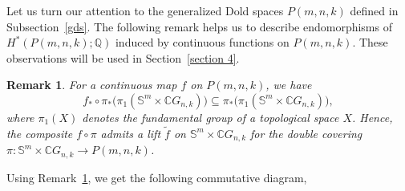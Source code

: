 \documentclass{amsart}
\newtheorem{remark}[theorem]{Remark}
\newcommand{\secref}[1]{Section~\ref{#1}}
\newcommand{\remref}[1]{Remark~\ref{#1}}
\newcommand{\subsecref}[1]{Subsection~\ref{#1}}
\begin{document}
	Let us turn our attention to the generalized Dold spaces $P(m,n,k)$ defined in \subsecref{gds}. The following remark helps us to describe endomorphisms of $H^*(P(m,n,k);\mathbb{Q})$ induced by continuous functions on $P(m,n,k)$. These observations will be used in \secref{section 4}.
	\begin{remark}\label{lift}
		For a continuous map $f$ on $P(m,n,k)$, we have  
		\begin{equation} \label{lift of f}
			f_*\circ \pi_*\big(\pi_1(\mathbb{S}^m\times \mathbb{C}G_{n,k})\big)
			\subseteq \pi_*\big(\pi_1(\mathbb{S}^m\times \mathbb{C}G_{n,k})\big),
		\end{equation}
		where $\pi_1(X)$ denotes the fundamental group of a topological space $X$. Hence, the composite $f\circ \pi$ admits a lift $\tilde f$ on
		$\mathbb{S}^m\times \mathbb{C}G_{n,k}$ for the double covering  
		$\pi:\mathbb{S}^m\times \mathbb{C}G_{n,k}\to P(m,n,k)$.
	\end{remark}
	Using \remref{lift}, we get the following commutative diagram,
	
\end{document}
